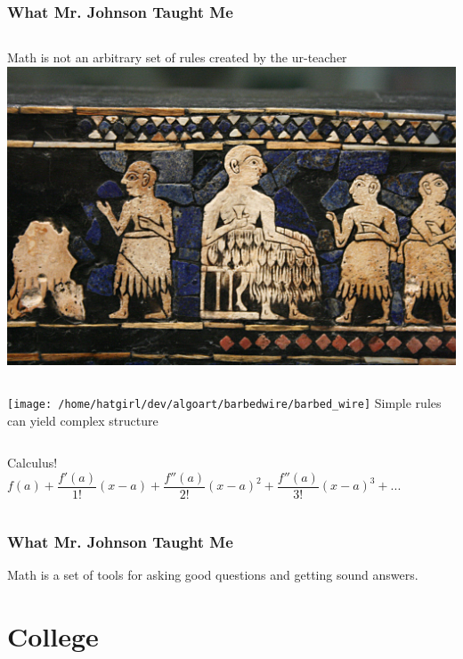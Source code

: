 \documentclass{beamer}
\theoremstyle{mystyle}
\begin{document}
\begin{frame}
\frametitle{What Mr. Johnson Taught Me}

\begin{columns}
		Math is not an arbitrary set of rules created by the ur-teacher\\
		\includegraphics[scale=0.027]{ur.jpg}
\end{columns} 
	\pause
\begin{columns}
		\texttt{[image: /home/hatgirl/dev/algoart/barbedwire/barbed\_wire]}		
		Simple rules can yield complex structure
\end{columns}
	\pause
\begin{columns}
		Calculus!
		\[f(a) + \frac{f'(a)}{1!}(x-a) + \frac{f''(a)}{2!}(x-a)^2 + \frac{f''(a)}{3!}(x-a)^3 + ... \]		
\end{columns}

\end{frame}

\begin{frame}
\frametitle{What Mr. Johnson Taught Me}
	Math is a set of tools for asking good questions and getting sound answers.

\end{frame}
\section{College}
\frame{\tableofcontents[currentsection]}

\begin{frame}

\end{frame}
\end{document}
